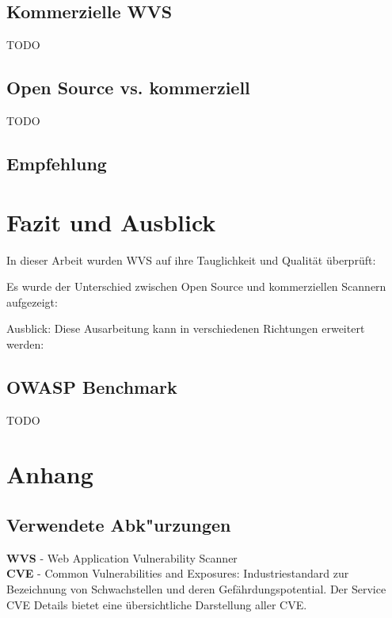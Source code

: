 \documentclass[12pt,oneside,a4paper,parskip]{scrbook}
\begin{document}
  \section{Kommerzielle WVS}
  TODO
  \section{Open Source vs. kommerziell}
  TODO
  \section{Empfehlung}


\chapter{Fazit und Ausblick}
In dieser Arbeit wurden WVS auf ihre Tauglichkeit und Qualität überprüft:

Es wurde der Unterschied zwischen Open Source und kommerziellen Scannern aufgezeigt:

Ausblick: Diese Ausarbeitung kann in verschiedenen Richtungen erweitert werden:
  \section{OWASP Benchmark}
  TODO


\backmatter



\cleardoublepage
{}
{}
\printbibliography[title=Quellenverzeichnis]

\appendix
  \chapter{Anhang}

  \section{Verwendete Abk"urzungen}
  \textbf{WVS} - Web Application Vulnerability Scanner\\

  \textbf{CVE} - Common Vulnerabilities and Exposures: Industriestandard zur Bezeichnung von
  Schwachstellen und deren Gefährdungspotential. Der Service CVE Details \cite{cve} bietet
  eine übersichtliche Darstellung aller CVE.\\
\end{document}
